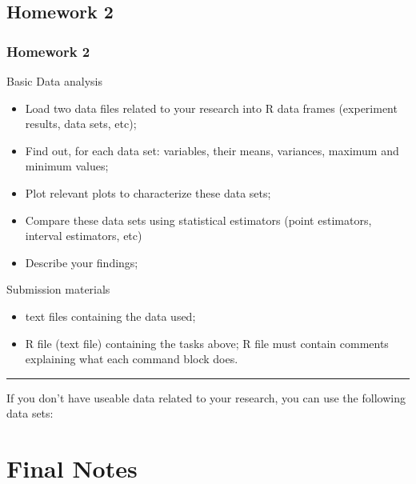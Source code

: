 \documentclass[10pt]{beamer}
\begin{document}
\subsection{Homework 2}
\begin{frame}
  \frametitle{Homework 2}
  \begin{block}{Basic Data analysis}
    \begin{itemize}
    \item Load two data files related to your research into R data
      frames (experiment results, data sets, etc);
    \item Find out, for each data set: variables, their means,
      variances, maximum and minimum values;
    \item Plot relevant plots to characterize these data sets;
    \item Compare these data sets using statistical estimators (point
      estimators, interval estimators, etc)
    \item Describe your findings;
    \end{itemize}
  \end{block}
  \begin{block}{Submission materials}
    \begin{itemize}
    \item {} text files containing the data used;
    \item {} R file (text file) containing the
      tasks above; R file must contain comments explaining what each
      command block does.
    \end{itemize}
  \end{block}
  \rule{\textwidth}{0.4pt} {\tiny If you don't have useable data
    related to your research, you can use the following data sets:}
\end{frame}

\section{Final Notes}
\end{document}
